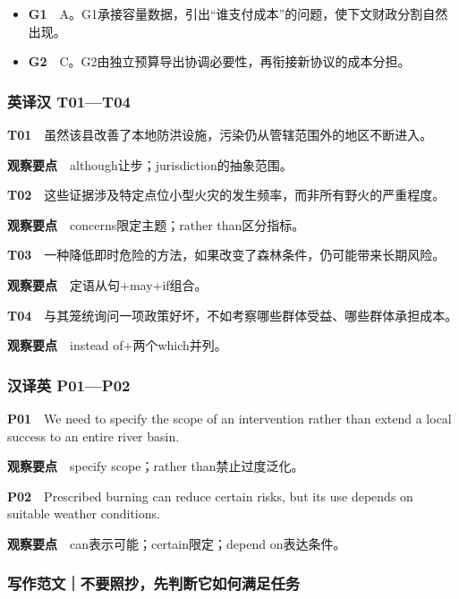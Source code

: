\documentclass[
  11pt,
]{ctexart}
\begin{document}
\begin{itemize}
\item
  \textbf{G1}　A。G1承接容量数据，引出``谁支付成本''的问题，使下文财政分割自然出现。
\item
  \textbf{G2}　C。G2由独立预算导出协调必要性，再衔接新协议的成本分担。
\end{itemize}

\subsubsection{英译汉 T01---T04}\label{ux82f1ux8bd1ux6c49-t01t04}

\textbf{T01}　虽然该县改善了本地防洪设施，污染仍从管辖范围外的地区不断进入。

\textbf{观察要点}　although让步；jurisdiction的抽象范围。

\textbf{T02}　这些证据涉及特定点位小型火灾的发生频率，而非所有野火的严重程度。

\textbf{观察要点}　concerns限定主题；rather than区分指标。

\textbf{T03}　一种降低即时危险的方法，如果改变了森林条件，仍可能带来长期风险。

\textbf{观察要点}　定语从句+may+if组合。

\textbf{T04}　与其笼统询问一项政策好坏，不如考察哪些群体受益、哪些群体承担成本。

\textbf{观察要点}　instead of+两个which并列。

\subsubsection{汉译英 P01---P02}\label{ux6c49ux8bd1ux82f1-p01p02}

\textbf{P01}　We need to specify the scope of an intervention rather
than extend a local success to an entire river basin.

\textbf{观察要点}　specify scope；rather than禁止过度泛化。

\textbf{P02}　Prescribed burning can reduce certain risks, but its use
depends on suitable weather conditions.

\textbf{观察要点}　can表示可能；certain限定；depend on表达条件。

\subsubsection{写作范文｜不要照抄，先判断它如何满足任务}\label{ux5199ux4f5cux8303ux6587ux4e0dux8981ux7167ux6284ux5148ux5224ux65adux5b83ux5982ux4f55ux6ee1ux8db3ux4efbux52a1}
\end{document}
